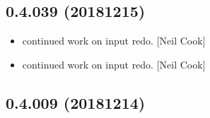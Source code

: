 \documentclass[a4paper,10pt,english]{report}
\begin{document}
\subsection{0.4.039 (2018\sphinxhyphen{}12\sphinxhyphen{}15)}
\label{\detokenize{misc/changelog:id251}}\begin{itemize}
\item {} 
 \sphinxhyphen{} continued work on input redo. {[}Neil Cook{]}

\item {} 
 \sphinxhyphen{} continued work on input redo. {[}Neil Cook{]}

\end{itemize}


\subsection{0.4.009 (2018\sphinxhyphen{}12\sphinxhyphen{}14)}
\end{document}
